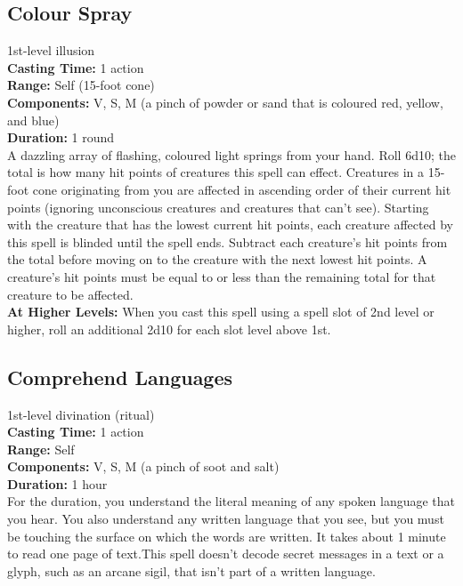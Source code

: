 \documentclass[11pt, A4paper, english]{article}
\begin{document}
		\subsection{Colour Spray}
1st-level illusion \\
\textbf{Casting Time:} 1 action \\
\textbf{Range:} Self (15-foot cone) \\
\textbf{Components:} V, S, M (a pinch of powder or sand that is coloured red, yellow, and blue) \\
\textbf{Duration:} 1 round \\
A dazzling array of flashing, coloured light springs from your hand. Roll 6d10; the total is how many hit points of creatures this spell can effect. Creatures in a 15-foot cone originating from you are affected in ascending order of their current hit points (ignoring unconscious creatures and creatures that can’t see). Starting with the creature that has the lowest current hit points, each creature affected by this spell is blinded until the spell ends. Subtract each creature’s hit points from the total before moving on to the creature with the next lowest hit points. A creature’s hit points must be equal to or less than the remaining total for that creature to be affected. \\
\textbf{At Higher Levels:} When you cast this spell using a spell slot of 2nd level or higher, roll an additional 2d10 for each slot level above 1st.

		\subsection{Comprehend Languages}
1st-level divination (ritual) \\
\textbf{Casting Time:} 1 action \\
\textbf{Range:} Self \\
\textbf{Components:} V, S, M (a pinch of soot and salt) \\
\textbf{Duration:} 1 hour \\
For the duration, you understand the literal meaning of any spoken language that you hear. You also understand any written language that you see, but you must be touching the surface on which the words are written. It takes about 1  minute to read one page of text.This spell doesn’t decode secret messages in a text or a glyph, such as an arcane sigil, that isn’t part of a written language.
\end{document}
